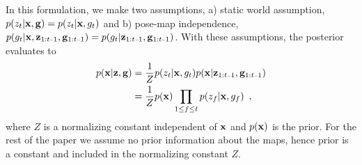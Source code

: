 \documentclass[letterpaper, 10 pt, conference]{ieeeconf} %
\begin{document}

In this formulation, we make two assumptions, a) static world assumption, $p(z_t|\mathbf{x},
\mathbf{g}) = p(z_t|\mathbf{x}, g_t)$ and b) pose-map independence,
$p(g_t|\map, \remaining) = p(g_t|\remaining)$. With these assumptions,
the posterior evaluates \cite{merali2013icra} to
\begin{align}
 p(\map | \measurements, \poses) &= \frac{1}{Z} p(z_t|\map , g_t)p(\map| \remaining)\\
                               &= \frac{1}{Z} p(\map)\prod_{1 \le f \le t}
 p(z_f|\map, g_f)\enspace,
 \label{eq:map}
\end{align}
where $Z$ is a normalizing constant independent of $\mathbf{x}$ and $p(\mathbf{x})$ is
the prior. For the rest of the paper we assume no prior information about
the maps, hence prior is a constant and included in the normalizing
constant $Z$. 
\end{document}
